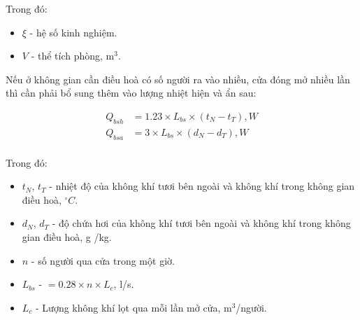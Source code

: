 Trong đó:
\begin{itemize}
	\item $\xi$ - hệ số kinh nghiệm.
	\item $V$ - thể tích phòng, m$^3$.
\end{itemize}

Nếu ở không gian cần điều hoà có số người ra vào nhiều, cửa đóng mở nhiều lần thì cần phải bổ sung thêm vào lượng nhiệt hiện và ẩn sau:

\begin{equation*}
	\begin{split}
		Q_{bsh} &= 1.23\times L_{bs}\times (t_{N} - t_{T}), W\\
		Q_{bsa} &= 3\times L_{bs}\times (d_{N} - d_{T}), W\\
	\end{split}
\end{equation*}

Trong đó:
\begin{itemize}
	\item $t_{N}$, $t_{T}$ - nhiệt độ của không khí tươi bên ngoài và không khí trong không gian điều hoà, $^{\circ}C$.
	\item $d_{N}$, $d_{T}$ - độ chứa hơi của không khí tươi bên ngoài và không khí trong không gian điều hoà, g /kg.
	\item $ n $ - số người qua cửa trong một giờ.
	\item $L_{bs}$ - $= 0.28\times n\times L_{c}$, l/s.
	\item $L_{c}$ - Lượng không khí lọt qua mỗi lần mở cửa, m$^3$/người. 
\end{itemize}

